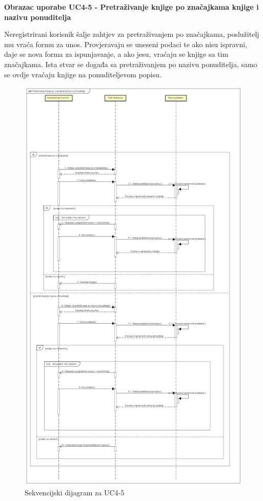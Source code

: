 \eject	

\textbf{Obrazac uporabe UC4-5 - Pretraživanje knjige po značajkama knjige i nazivu ponuditelja}

Neregistrirani korisnik šalje zahtjev za pretraživanjem po značajkama, poslužitelj mu vraća formu za unos. Provjeravaju se uneseni podaci te ako nisu ispravni, daje se nova forma za ispunjavanje, a ako jesu, vraćaju se knjige sa tim značajkama. Ista stvar se događa sa pretraživanjem po nazivu ponuditelja, samo se ovdje vraćaju knjige na ponuditeljevom popisu. 

\begin{figure}[H]
	\includegraphics[scale=0.3]{slike/sekvencijskiDijagramPretrazivanjeKnjigePoZnacajkama.png} %
	\centering
	\caption{Sekvencijski dijagram za UC4-5}
	\label{fig:Sekvencijski dijagam za UC4-5}
\end{figure}


